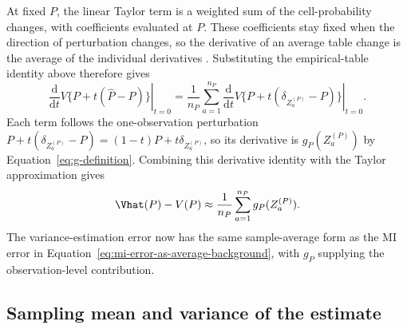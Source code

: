 At fixed \(P\), the linear Taylor term is a weighted sum of the
cell-probability changes, with coefficients evaluated at \(P\). These
coefficients stay fixed when the direction of perturbation changes, so
the derivative of an average table change is the average of the
individual derivatives \citep[Chapter~20]{vanderVaart1998}. Substituting
the empirical-table identity above therefore gives
\begin{equation*}
  \left.\frac{\mathrm d}{\mathrm dt}
    V\{P+t(\widehat P-P)\}\right|_{t=0}
  =\frac{1}{n_P}\sum_{a=1}^{n_P}
    \left.\frac{\mathrm d}{\mathrm dt}
    V\{P+t(\delta_{Z_a^{(P)}}-P)\}\right|_{t=0}.
\end{equation*}
Each term follows the one-observation perturbation
\(P+t(\delta_{Z_a^{(P)}}-P)=(1-t)P+t\delta_{Z_a^{(P)}}\), so its
derivative is \(g_P(Z_a^{(P)})\) by Equation~\eqref{eq:g-definition}.
Combining this derivative identity with the Taylor approximation gives
\begin{equation}
  \Vhat(P)-V(P)
  \approx
  \frac{1}{n_P}
  \sum_{a=1}^{n_P}g_P(Z_a^{(P)}).
  \label{eq:vhat-linearization}
\end{equation}
The variance-estimation error now has the same sample-average form as the
MI error in Equation~\eqref{eq:mi-error-as-average-background}, with
\(g_P\) supplying the observation-level contribution.

\subsection{Sampling mean and variance of the estimate}

